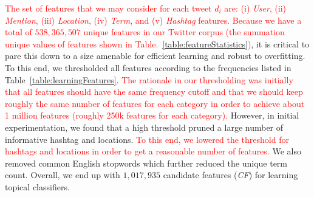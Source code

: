 \textcolor{red}{The set of features that we may consider for each tweet $d_i$ are: (i) \textit{User}, (ii) \textit{Mention}, (iii) \textit{Location}, (iv) \textit{Term}, and (v) \textit{Hashtag} features.}
%
\textcolor{red}{Because we have a total of $538,365,507$ unique features in our
Twitter corpus (the summation unique values of features shown in Table.~\ref{table:featureStatistics})}, it is critical to pare this down to a size amenable
for efficient learning and robust to overfitting.  To this end, we
thresholded all features according to the frequencies listed in
Table~\ref{table:learningFeatures}.  
\textcolor{red}{The rationale in our thresholding was initially that all features should have the same frequency cutoff and that we should keep roughly the same number of features for each category in order to achieve about 1 million features (roughly 250k features for each category).}  However, in  initial experimentation, we found that a high threshold pruned a large number of informative hashtag and locations.  \textcolor{red}{To this end, we lowered the threshold for hashtags and locations in order to get a reasonable number of features.}  We also removed common English stopwords which further reduced the unique term count.  Overall, we end up with $1,017,935$ candidate features (\textit{CF}) for learning topical classifiers.


